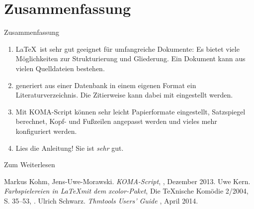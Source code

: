 \malte

\section*{Zusammenfassung}

\begin{frame}[fragile]{Zusammenfassung}
  \begin{enumerate}
    \item \LaTeX\ ist sehr gut geeignet für \alert{umfangreiche Dokumente}:
      Es bietet viele Möglichkeiten zur \alert{Strukturierung} und
      \alert{Gliederung}. Ein Dokument kann aus
      \alert{vielen Quelldateien} bestehen.
    \item \alert{\BibTeX} generiert aus einer \alert{Datenbank} in einem eigenen Format
      ein \alert{Literaturverzeichnis}. Die \alert{Zitierweise} kann dabei mit
      \lstinline-- eingestellt werden.
    \item Mit \alert{KOMA-Script} können sehr leicht \alert{Papierformate}
      eingestellt, \alert{Satzspiegel}
      berechnet, \alert{Kopf- und Fußzeilen} angepasst werden und vieles
      mehr konfiguriert werden.
    \item \alert{Lies die Anleitung!} Sie ist \emph{sehr} gut.
  \end{enumerate}
\end{frame}

\begin{Frame}[fragile]{Zum Weiterlesen}
  \begin{mybib}
      Markus Kohm, Jens-Uwe-Morawski.
      \newblock \emph{KOMA-Script},
      \newblock {}, Dezember 2013.
      Uwe Kern.
      \newblock \emph{Farbspielereien in \LaTeX mit dem xcolor-Paket},
      \newblock Die \TeX nische Komödie 2/2004, S. 35--53,
      \newblock {}.
      Ulrich Schwarz.
      \newblock \emph{Thmtools Users’ Guide}
      \newblock {}, April 2014.
  \end{mybib}
\end{Frame}

